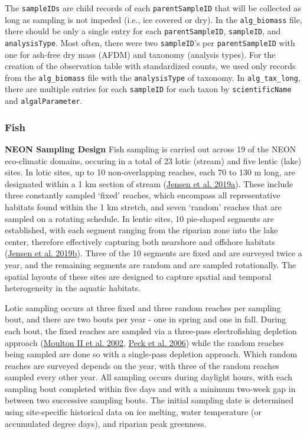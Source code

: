 \documentclass[
  12pt,
]{article}
\begin{document}
The \texttt{sampleIDs} are child records of each \texttt{parentSampleID} that will be collected as long as sampling is not impeded (i.e., ice covered or dry). In the \texttt{alg\_biomass} file, there should be only a single entry for each \texttt{parentSampleID}, \texttt{sampleID}, and \texttt{analysisType}. Most often, there were two \texttt{sampleID}'s per \texttt{parentSampleID} with one for ash-free dry mass (AFDM) and taxonomy (analysis types). For the creation of the observation table with standardized counts, we used only records from the \texttt{alg\_biomass} file with the \texttt{analysisType} of taxonomy. In \texttt{alg\_tax\_long}, there are multiple entries for each \texttt{sampleID} for each taxon by \texttt{scientificName} and \texttt{algalParameter}.

\hypertarget{fish}{%
\subsubsection{Fish}\label{fish}}

\textbf{NEON Sampling Design} Fish sampling is carried out across 19 of the NEON eco-climatic domains, occuring in a total of 23 lotic (stream) and five lentic (lake) sites. In lotic sites, up to 10 non-overlapping reaches, each 70 to 130 m long, are designated within a 1 km section of stream (\protect\hyperlink{ref-Jensen2019a}{Jensen et al. 2019a}). These include three constantly sampled `fixed' reaches, which encompass all representative habitats found within the 1 km stretch, and seven `random' reaches that are sampled on a rotating schedule. In lentic sites, 10 pie-shaped segments are established, with each segment ranging from the riparian zone into the lake center, therefore effectively capturing both nearshore and offshore habitats (\protect\hyperlink{ref-Jensen2019b}{Jensen et al. 2019b}). Three of the 10 segments are fixed and are surveyed twice a year, and the remaining segments are random and are sampled rotationally. The spatial layouts of these sites are designed to capture spatial and temporal heterogeneity in the aquatic habitats.

Lotic sampling occurs at three fixed and three random reaches per sampling bout, and there are two bouts per year - one in spring and one in fall. During each bout, the fixed reaches are sampled via a three-pass electrofishing depletion approach (\protect\hyperlink{ref-moulton2002revised}{Moulton II et al. 2002}, \protect\hyperlink{ref-peck2006environmental}{Peck et al. 2006}) while the random reaches being sampled are done so with a single-pass depletion approach. Which random reaches are surveyed depends on the year, with three of the random reaches sampled every other year. All sampling occurs during daylight hours, with each sampling bout completed within five days and with a minimum two-week gap in between two successive sampling bouts. The initial sampling date is determined using site-specific historical data on ice melting, water temperature (or accumulated degree days), and riparian peak greenness.
\end{document}
